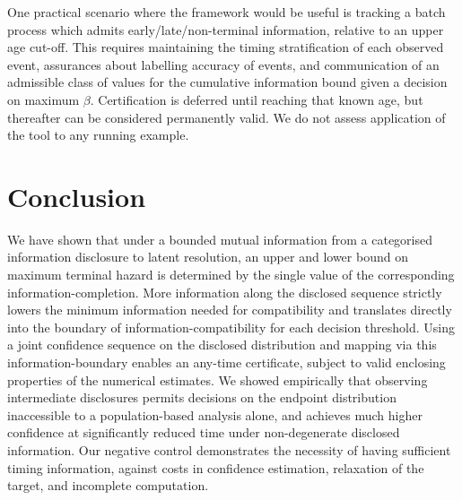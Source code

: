 One practical scenario where the framework would be useful is tracking a batch process which admits early/late/non-terminal information, relative to an upper age cut-off. This requires maintaining the timing stratification of each observed event, assurances about labelling accuracy of events, and communication of an admissible class of values for the cumulative information bound given a decision on maximum $\beta$. Certification is deferred until reaching that known age, but thereafter can be considered permanently valid. We do not assess application of the tool to any running example.

\section{Conclusion}\label{sec:conclusion} 
We have shown that under a bounded mutual information from a categorised information disclosure to latent resolution, an upper and lower bound on maximum terminal hazard is determined by the single value of the corresponding information-completion. More information along the disclosed sequence strictly lowers the minimum information needed for compatibility and translates directly into the boundary of information-compatibility for each decision threshold. Using a joint confidence sequence on the disclosed distribution and mapping via this information-boundary enables an any-time certificate, subject to valid enclosing properties of the numerical estimates. We showed empirically that observing intermediate disclosures permits decisions on the endpoint distribution inaccessible to a population-based analysis alone, and achieves much higher confidence at significantly reduced time under non-degenerate disclosed information. Our negative control demonstrates the necessity of having sufficient timing information, against costs in confidence estimation, relaxation of the target, and incomplete computation.
